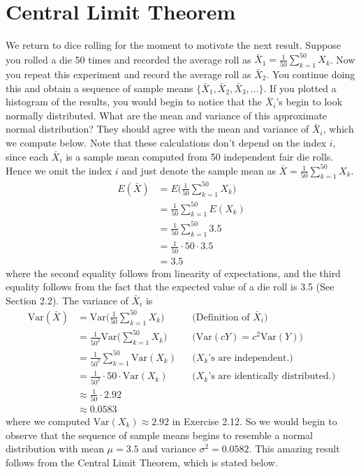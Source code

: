 \documentclass{tufte-book}
\newcommand\var{\text{Var}}
\theoremstyle{definition}
\numberwithin{theorem}{section}
\numberwithin{definition}{section}
\numberwithin{lemma}{section}
\numberwithin{corollary}{section}
\numberwithin{proposition}{section}
\numberwithin{remark}{section}
\numberwithin{claim}{section}
\numberwithin{observation}{section}
\numberwithin{fact}{section}
\numberwithin{assumption}{section}
\numberwithin{example}{section}
\numberwithin{exercise}{section}
\begin{document}
\chapter{Central Limit Theorem}

We return to dice rolling for the moment to motivate the next result. Suppose you rolled a die 50 times and recorded the average roll as $\bar{X}_1 = \frac{1}{50}\sum_{k=1}^{50}X_k$. Now you repeat this experiment and record the average roll as $\bar{X}_2$. You continue doing this and obtain a sequence of sample means $\{\bar{X}_1,\bar{X}_2,\bar{X}_3,\dots\}$. If you plotted a histogram of the results, you would begin to notice that the $\bar{X}_i$'s begin to look normally distributed. What are the mean and variance of this approximate normal distribution? They should agree with the mean and variance of $\bar{X}_i$, which we compute below. Note that these calculations don't depend on the index $i$, since each $\bar{X}_i$ is a sample mean computed from 50 independent fair die rolls. Hence we omit the index $i$ and just denote the sample mean as $\bar{X} = \frac{1}{50} \sum_{k=1}^{50} X_k$.
\begin{align*}
E(\bar{X}) &= E\Big( \frac{1}{50} \sum_{k=1}^{50}X_k\Big) \\
&= \frac{1}{50}\sum_{k=1}^{50} E(X_k) \\
&= \frac{1}{50} \sum_{k=1}^{50} 3.5 \\
&= \frac{1}{50} \cdot 50 \cdot 3.5 \\
&= 3.5
\end{align*}
where the second equality follows from linearity of expectations, and the third equality follows from the fact that the expected value of a die roll is 3.5 (See Section 2.2). The variance of $\bar{X}_i$ is
\begin{align*}
\var(\bar{X}) &= \var\Big(\frac{1}{50} \sum_{k=1}^{50} X_k \Big) &&\text{(Definition of $\bar{X}_i$)}\\
&= \frac{1}{50^2} \var\Big( \sum_{k=1}^{50} X_k\Big) &&\text{($\var(cY) = c^2\var(Y)$)} \\
&= \frac{1}{50^2} \sum_{k=1}^{50} \var(X_k) &&\text{($X_k$'s are independent.)}\\
&= \frac{1}{50^2} \cdot 50 \cdot \var(X_k) &&\text{($X_k$'s are identically distributed.)}\\
&\approx \frac{1}{50} \cdot 2.92 \\
&\approx 0.0583
\end{align*}
where we computed $\var(X_k) \approx 2.92$ in Exercise 2.12. So we would begin to observe that the sequence of sample means begins to resemble a normal distribution with mean $\mu = 3.5$ and variance $\sigma^2 = 0.0582$. This amazing result follows from the Central Limit Theorem, which is stated below.
\end{document}
